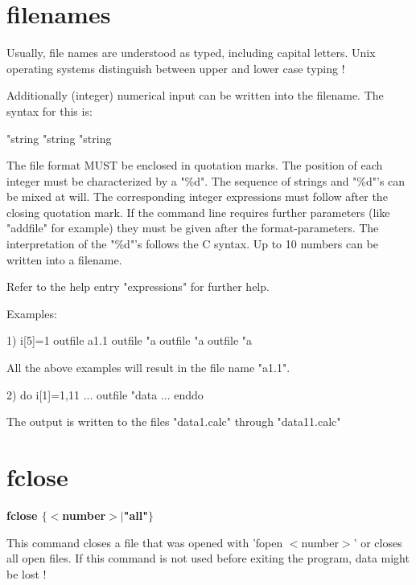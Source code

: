 \section{filenames}
Usually, file names are understood as typed, including capital 
letters. Unix operating systems distinguish between upper and lower 
case typing ! 
\par
Additionally (integer) numerical input can be written into the 
filename. The syntax for this is: 
\par
\begin{MacVerbatim}
"string%
"string%
"string%
\end{MacVerbatim}
The file format MUST be enclosed in quotation marks. The position of 
each integer must be characterized by a "\%d". The sequence of strings 
and "\%d"'s can be mixed at will. The corresponding integer expressions 
must follow after the closing quotation mark. If the command line 
requires further parameters (like "addfile" for example) they must 
be given after the format-parameters. 
The interpretation of the "\%d"'s follows the C syntax. Up to 10 numbers 
can be written into a filename. 
\par
Refer to the help entry "expressions" for further help. 
\par
Examples: 
\begin{MacVerbatim}
1)
i[5]=1
outfile a1.1
outfile "a%
outfile "a%
outfile "a%
\end{MacVerbatim}
All the above examples will result in the file name "a1.1". 
\par
\begin{MacVerbatim}
2)
do i[1]=1,11
...
outfile "data%
...
enddo
\end{MacVerbatim}
The output is written to the files "data1.calc" through "data11.calc" 
\section{fclose}
{\bf fclose $ \{$$ <$number$> $$| $"all"$\} $ \par }
\par
\vspace{3pt}
This command closes a file that was opened with 'fopen $ <$number$> $' or 
closes all open files. If this 
command is not used before exiting the program, data might be lost ! 
